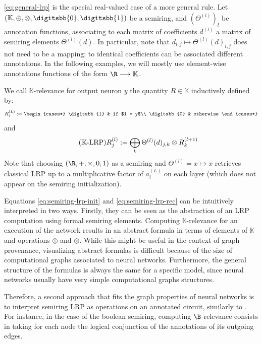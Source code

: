 \documentclass[twocolumn]{../cs-classes/cs-classes}
\newcommand*{\K}{\mathbb{K}}
\newcommand*{\1}{\digitsbb{1}}
\newcommand*{\0}{\digitsbb{0}}
\begin{document}
\autoref{eq:general-lrp} is the special real-valued case of a more general rule. Let $(\K, \oplus, \otimes, \0, \1)$ be a semiring, and $(\Theta^{(l)})_l$ be annotation functions, associating to each matrix of coefficients $d^{(l)}$ a matrix of semiring elements $\Theta^{(l)}(d)$. In particular, note that $d_{i,j} \mapsto \Theta^{(l)}(d)_{i,j}$ does not need to be a mapping: to identical coefficients can be associated different annotations. In the following examples, we will mostly use element-wise annotations functions of the form $\R\longrightarrow\K$.

We call $\K$-relevance for output neuron $y$ the quantity $R\in\K$ inductively defined by:
\begin{equation}
    R^{(L)}_i := \begin{cases*}
        \1 & if $i = y$\\
        \0 & otherwise
    \end{cases*}
    \label{eq:semiring-lrp-init}
\end{equation}
and
\begin{equation}
    \tag{$\K$-LRP}
    R^{(l)}_j := \bigoplus_{k}\Theta^{(l)}(d)_{j,k} \otimes R^{(l+1)}_k
    \label{eq:semiring-lrp-rec}
\end{equation}
Note that choosing $(\R,+,\times,0,1)$ as a semiring and $\Theta^{(l)}=x\mapsto x$ retrieves classical LRP up to a multiplicative factor of $a_i^{(L)}$ on each layer (which does not appear on the semiring initialization).

Equations \ref{eq:semiring-lrp-init} and \ref{eq:semiring-lrp-rec} can be intuitively interpreted in two ways. Firstly, they can be seen as the abstraction of an LRP computation using formal semiring elements. Computing $\K$-relevance for an execution of the network results in an abstract formula in terms of elements of $\K$ and operations $\oplus$ and $\otimes$. While this might be useful in the context of graph provenance, visualizing abstract formulas is difficult because of the size of computational graphs associated to neural networks. Furthermore, the general structure of the formulas is always the same for a specific model, since neural networks usually have very simple computational graphs structures. 


Therefore, a second approach that fits the graph properties of neural networks is to interpret semiring LRP as operations on an annotated circuit, similarly to \cite{senellart2018provenance}. For instance, in the case of the boolean semiring, computing $\B$-relevance consists in taking for each node the logical conjunction of the annotations of its outgoing edges.
\end{document}
